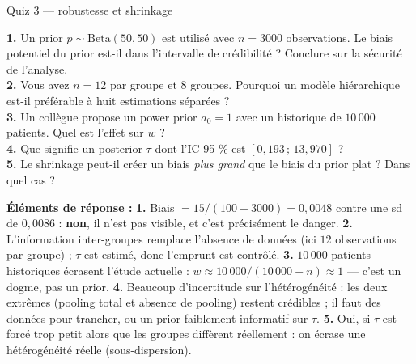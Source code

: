 \begin{frame}{Quiz 3 — robustesse et shrinkage}
\begin{qbox}
\textbf{1.} Un prior $p \sim \mathrm{Beta}(50,50)$ est utilisé avec $n = 3000$
observations. Le biais potentiel du prior est-il dans l'intervalle de crédibilité ?
Conclure sur la sécurité de l'analyse. \\[1mm]
\textbf{2.} Vous avez $n = 12$ par groupe et $8$ groupes. Pourquoi un modèle
hiérarchique est-il préférable à huit estimations séparées ? \\[1mm]
\textbf{3.} Un collègue propose un power prior $a_0 = 1$ avec un historique
de $10\,000$ patients. Quel est l'effet sur $w$ ? \\[1mm]
\textbf{4.} Que signifie un posterior $\tau$ dont l'IC 95 \% est
$[0{,}193 \,;\, 13{,}970]$ ? \\[1mm]
\textbf{5.} Le shrinkage peut-il créer un biais \emph{plus grand} que le biais
du prior plat ? Dans quel cas ?
\vspace{1.5mm}

\textcolor{byBlue}{\textbf{Éléments de réponse :}}
\textbf{1.} Biais $= 15/(100+3000) = 0{,}0048$ contre une sd de $0{,}0086$ :
\textbf{non}, il n'est pas visible, et c'est précisément le danger.
\quad
\textbf{2.} L'information inter-groupes remplace l'absence de données (ici
$12$ observations par groupe) ; $\tau$ est estimé, donc l'emprunt est contrôlé.
\quad
\textbf{3.} $10\,000$ patients historiques écrasent l'étude actuelle :
$w \approx 10\,000/(10\,000+n) \approx 1$ — c'est un dogme, pas un prior.
\quad
\textbf{4.} Beaucoup d'incertitude sur l'hétérogénéité : les deux extrêmes
(pooling total et absence de pooling) restent crédibles ; il faut des données
pour trancher, ou un prior faiblement informatif sur $\tau$.
\quad
\textbf{5.} Oui, si $\tau$ est forcé trop petit alors que les groupes diffèrent
réellement : on écrase une hétérogénéité réelle (sous-dispersion).
\end{qbox}
\end{frame}

